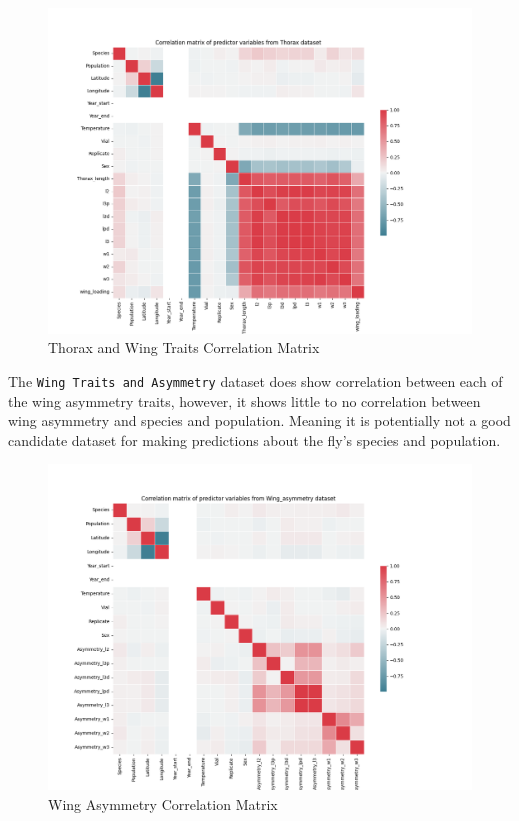 \documentclass{article}
\begin{document}
\begin{figure}[htb]
    \centering
    \includegraphics[width=0.8\columnwidth]{plots/Thorax_corr_matrix.png}
    \caption{Thorax and Wing Traits Correlation Matrix}
    \label{fig:thorax_wing_traits_corr_matrix}
\end{figure}

\newpage
The \texttt{Wing Traits and Asymmetry} dataset does show correlation between each of the wing asymmetry traits, however, it shows little to no correlation between wing asymmetry and species and population. Meaning it is potentially not a good candidate dataset for making predictions about the fly's species and population.

\begin{figure}[htb]
    \centering
    \includegraphics[width=0.8\columnwidth]{plots/Wing_asymmetry_corr_matrix.png}
    \caption{Wing Asymmetry Correlation Matrix}
    \label{fig:wing_asymmetry_corr_matrix}
\end{figure}
\end{document}
